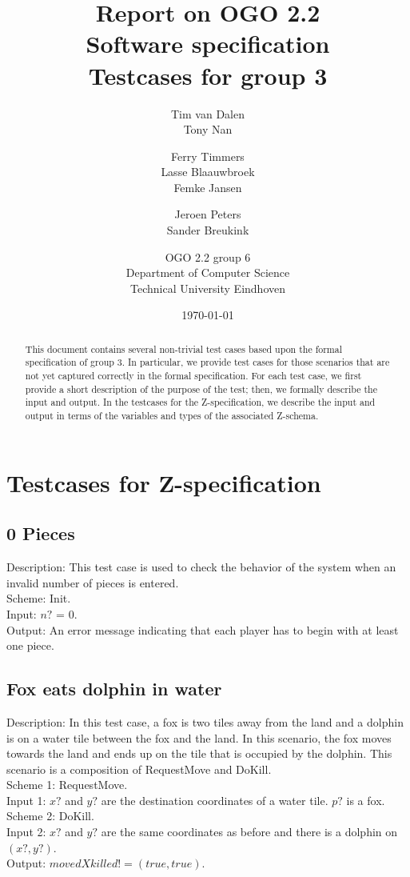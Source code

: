 \documentclass[a4paper,11pt]{article}
\title{Report on OGO 2.2 \\ Software specification\\ Testcases for group 3}
\author{
        Tim van Dalen\\ Tony Nan \and Ferry Timmers\\ Lasse Blaauwbroek\\ Femke Jansen \and Jeroen Peters\\ Sander Breukink \and OGO 2.2 group 6 \\
                Department of Computer Science\\
        Technical University Eindhoven\\
}
\date{\today}
\begin{document}
\maketitle

\begin{abstract}
This document contains several non-trivial test cases based upon the formal specification of group 3. In particular, we provide test cases for those scenarios that are not yet captured correctly in the formal specification. For each test case, we first provide a short description of the purpose of the test; then, we formally describe the input and output. In the testcases for the Z-specification, we describe the input and output in terms of the variables and types of the associated Z-schema.
\end{abstract}

    \section{Testcases for Z-specification}

\subsection{0 Pieces}
    Description: This test case is used to check the behavior of the system when an invalid number of pieces is entered. \\
    Scheme: Init.\\
    Input: $n?$ = 0.\\
    Output: An error message indicating that each player has to begin with at least one piece.

\subsection{Fox eats dolphin in water}
    Description: In this test case, a fox is two tiles away from the land and a dolphin is on a water tile between the fox and the land. In this scenario, the fox moves towards the land and ends up on the tile that is occupied by the dolphin. This scenario is a composition of RequestMove and DoKill. \\
    Scheme 1: RequestMove.\\
    Input 1: $x?$ and $y?$ are the destination coordinates of a water tile. $p?$ is a fox.\\
    Scheme 2: DoKill.\\
    Input 2: $x?$ and $y?$ are the same coordinates as before and there is a dolphin on $(x?,y?)$.\\
    Output: $movedXkilled! = (true,true)$.\\
\end{document}
